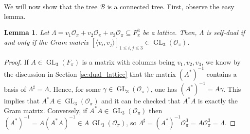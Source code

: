 \documentclass{eptcs}
\newtheorem{lemma}[theorem]{Lemma}
\theoremstyle{remark}
\theoremstyle{definition}
\DeclareMathOperator{\GL}{GL}
\newcommand{\dual}[1]{{#1}^{\sharp}}
\begin{document}
We will now show that the tree $\mathcal{B}$ is a connected tree. First, observe the easy lemma.
\begin{lemma}
  \label{le:gramm_matrix}
  Let $ \Lambda =  v_{1}\mathcal{O}_{\pi}+ v_{2} \mathcal{O}_{\pi} + v_{3}\mathcal{O}_{\pi} \subseteq F_{\pi}^{3}$ be a lattice. Then, $\Lambda$ is self-dual if and only if the Gram matrix $[ \langle v_{i}, v_{j} \rangle]_{1 \leq i ,j \leq 3} \in \GL_{3}(\mathcal{O}_{\pi})$.
\end{lemma}
\begin{proof}
If $A \in \GL_3(F_\pi)$ is a matrix with columns being  $v_1,v_2,v_3$, we know by the discussion in Section \ref{se:dual_lattice}
that the matrix $(A^*)^{-1}$ contains a basis of 
$\dual{\Lambda} = \Lambda$. 
Hence, for some $\gamma \in \GL_3(\mathcal{O}_\pi)$, 
one has $(A^*)^{-1} = A \gamma$.  
This implies that $A^* A \in \GL_3(\mathcal{O}_\pi)$ and it can be checked that $A^* A$ is exactly the Gram matrix.
Conversely, if $A^* A \in \GL_3(\mathcal{O}_\pi)$ then $(A^*)^{-1} = A (A^* A)^{-1} \in A\,\GL_3(\mathcal{O}_\pi)$, so $\dual{\Lambda} = (A^*)^{-1}\mathcal{O}_\pi^3 = A \mathcal{O}_\pi^3 = \Lambda$.
\end{proof}
\end{document}

